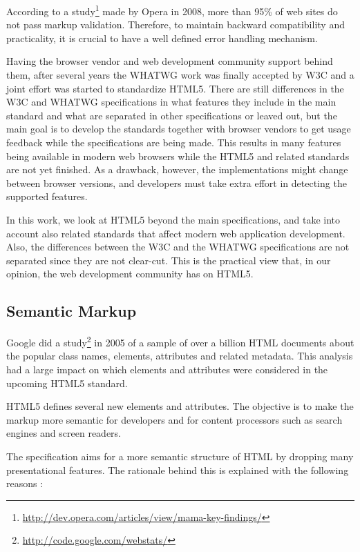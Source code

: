 According to a
study\footnote{\url{http://dev.opera.com/articles/view/mama-key-findings/}}
made by Opera in 2008, more than 95\% of web sites do not pass markup
validation. Therefore, to maintain backward compatibility and
practicality, it is crucial to have a well defined error handling
mechanism.

Having the browser vendor and web development community support behind
them, after several years the WHATWG work was finally accepted by W3C
and a joint effort was started to standardize HTML5. There are still
differences in the W3C and WHATWG specifications in what features they
include in the main standard and what are separated in other
specifications or leaved out, but the main goal is to develop the
standards together with browser vendors to get usage feedback while
the specifications are being made. This results in many features being
available in modern web browsers while the HTML5 and related standards
are not yet finished. As a drawback, however, the implementations
might change between browser versions, and developers must take extra
effort in detecting the supported features. \cite{pilgrim2010html5}

In this work, we look at HTML5 beyond the main specifications, and
take into account also related standards that affect modern web
application development. Also, the differences between the W3C and the
WHATWG specifications are not separated since they are not
clear-cut. This is the practical view that, in our opinion, the web
development community has on HTML5.

\subsection{Semantic Markup}

Google did a study\footnote{\url{http://code.google.com/webstats/}} in
2005 of a sample of over a billion HTML documents about the popular
class names, elements, attributes and related metadata. This analysis
had a large impact on which elements and attributes were considered in
the upcoming HTML5 standard.

HTML5 defines several new elements and attributes. The objective is to
make the markup more semantic for developers and for content
processors such as search engines and screen readers.

The specification aims for a more semantic structure of HTML by
dropping many presentational features. The rationale behind this is
explained with the following reasons \cite{HTML5draft}:

